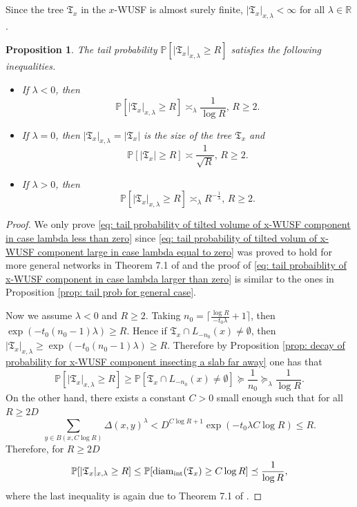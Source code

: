 \documentclass[12pt]{article}
\newtheorem{proposition}[theorem]{Proposition}
\numberwithin{equation}{section}
\newcommand{\be}{\begin{equation}}
\newcommand{\ee}{\end{equation}}
\newcommand{\1}{\mathbf{1}}
\begin{document}
Since the tree $\mathfrak{T}_x$ in the $x$-WUSF is almost surely finite, $|\mathfrak{T}_x|_{x,\lambda}<\infty$ for all $\lambda\in\mathbb{R}$. 
\begin{proposition}\label{prop: tail probability for tilted volume of x-wusf component}
	The tail probability  $\mathbb{P}[|\mathfrak{T}_x|_{x,\lambda}\geq R]$ satisfies the following inequalities. 
	\begin{itemize}
		\item If $\lambda<0$, then 
		\be\label{eq: tail probability of tilted volume of x-WUSF component in case lambda less than zero}
		\mathbb{P}[|\mathfrak{T}_x|_{x,\lambda}\geq R]\asymp_{\lambda} \frac{1}{\log R},\, R\geq 2.
		\ee
		
		\item  If $\lambda=0$, then $|\mathfrak{T}_x|_{x,\lambda}=|\mathfrak{T}_x|$ is the size of the tree $\mathfrak{T}_x$ and 
		\be\label{eq: tail probability of tilted volum of x-WUSF component large in case lambda equal to zero}
			\mathbb{P}[|\mathfrak{T}_x|\geq R]\asymp \frac{1}{\sqrt{R}}, \,R\geq 2.
		\ee
		
		\item  If $\lambda>0$, then 
		\be\label{eq: tail probaiblity of x-WUSF component in case lambda larger than zero}
			\mathbb{P}[|\mathfrak{T}_x|_{x,\lambda}\geq R]\asymp_{\lambda} R^{-\frac{1}{\lambda}}, \,R\geq 2.
		\ee
		
		
		
	\end{itemize}
\end{proposition}
\begin{proof}
	We only prove \eqref{eq: tail probability of tilted volume of x-WUSF component in case lambda less than zero} since \eqref{eq: tail probability of tilted volum of x-WUSF component large in case lambda equal to zero} was proved to hold for more general networks in Theorem 7.1 of \cite{Hutchcroft2018a} and the proof of  \eqref{eq: tail probaiblity of x-WUSF component in case lambda larger than zero} is similar to the ones in Proposition \ref{prop: tail prob for general case}. 
	
	Now we assume $\lambda<0$ and $R\geq 2$. Taking  $n_0=\lceil \frac{\log R}{-t_0\lambda}+1\rceil$, then $\exp(-t_0(n_0-1)\lambda)\geq R$. Hence if $\mathfrak{T}_x\cap L_{-n_0}(x)\neq \emptyset$, then 
$|\mathfrak{T}_x|_{x,\lambda}\geq \exp(-t_0(n_0-1)\lambda)\geq R$. Therefore by Proposition \ref{prop: decay of probability for x-WUSF component insecting a slab far away} one has that 
\[
	\mathbb{P}[|\mathfrak{T}_x|_{x,\lambda}\geq R]\geq 
	\mathbb{P}[\mathfrak{T}_x\cap L_{-n_0}(x)\neq \emptyset]\succeq\frac{1}{n_0}\succeq_\lambda
 \frac{1}{\log R}.
\]
	On the other hand, there exists a constant $C>0$ small enough such that for all $R\geq 2D$
	\[
	\sum_{y\in B(x,C\log R)}\Delta(x,y)^\lambda
	< D^{C\log R+1}\exp(-t_0\lambda C\log R)
	\leq  R.
	\]
	Therefore, for $R\geq 2D$
	\[
		\mathbb{P}[|\mathfrak{T}_x|_{x,\lambda}\geq R]
		\leq
		\mathbb{P}[\textnormal{diam}_{\textnormal{int}}(\mathfrak{T}_x)\geq C\log R] \preceq \frac{1}{\log R},
	\] 
	where the last inequality is again due to Theorem 7.1 of \cite{Hutchcroft2018a}.
\end{proof}
\end{document}

